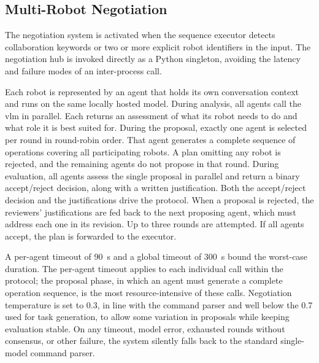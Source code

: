 \subsection{Multi-Robot Negotiation}\label{sec:negotiation-impl}
The negotiation system is activated when the sequence executor detects collaboration keywords or two or more explicit robot identifiers in the input. The negotiation hub is invoked directly as a Python singleton, avoiding the latency and failure modes of an inter-process call.

Each robot is represented by an agent that holds its own conversation context and runs on the same locally hosted model. During analysis, all agents call the \gls{vlm} in parallel. Each returns an assessment of what its robot needs to do and what role it is best suited for. During the proposal, exactly one agent is selected per round in round-robin order. That agent generates a complete sequence of operations covering all participating robots. A plan omitting any robot is rejected, and the remaining agents do not propose in that round. During evaluation, all agents assess the single proposal in parallel and return a binary accept/reject decision, along with a written justification. Both the accept/reject decision and the justifications drive the protocol. When a proposal is rejected, the reviewers' justifications are fed back to the next proposing agent, which must address each one in its revision. Up to three rounds are attempted. If all agents accept, the plan is forwarded to the executor.

A per-agent timeout of 90~s and a global timeout of 300~s bound the worst-case duration. The per-agent timeout applies to each individual call within the protocol; the proposal phase, in which an agent must generate a complete operation sequence, is the most resource-intensive of these calls. Negotiation temperature is set to 0.3, in line with the command parser and well below the 0.7 used for task generation, to allow some variation in proposals while keeping evaluation stable. On any timeout, model error, exhausted rounds without consensus, or other failure, the system silently falls back to the standard single-model command parser.
